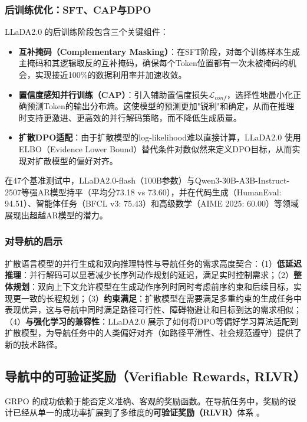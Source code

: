 \subsubsection{后训练优化：SFT、CAP与DPO}
LLaDA2.0 的后训练阶段包含三个关键组件：
\begin{itemize}
    \item \textbf{互补掩码（Complementary Masking）}：在SFT阶段，对每个训练样本生成主掩码和其逻辑取反的互补掩码，确保每个Token位置都有一次未被掩码的机会，实现接近100\%的数据利用率并加速收敛。
    \item \textbf{置信度感知并行训练（CAP）}：引入辅助置信度损失$\mathcal{L}_{conf}$，选择性地最小化正确预测Token的输出分布熵。这使模型的预测更加"锐利"和确定，从而在推理时支持更激进、更高效的并行解码策略，而不降低生成质量。
    \item \textbf{扩散DPO适配}：由于扩散模型的log-likelihood难以直接计算，LLaDA2.0 使用ELBO（Evidence Lower Bound）替代条件对数似然来定义DPO目标，从而实现对扩散模型的偏好对齐。
\end{itemize}

在47个基准测试中，LLaDA2.0-flash（100B参数）与Qwen3-30B-A3B-Instruct-2507等强AR模型持平（平均分73.18 vs 73.60），并在代码生成（HumanEval: 94.51）、智能体任务（BFCL v3: 75.43）和高级数学（AIME 2025: 60.00）等领域展现出超越AR模型的潜力。

\subsubsection{对导航的启示}
扩散语言模型的并行生成和双向推理特性与导航任务的需求高度契合：（1）\textbf{低延迟推理}：并行解码可以显著减少长序列动作规划的延迟，满足实时控制需求；（2）\textbf{整体规划}：双向上下文允许模型在生成动作序列时同时考虑前序约束和后续目标，实现更一致的长程规划；（3）\textbf{约束满足}：扩散模型在需要满足多重约束的生成任务中表现优异，这与导航中同时满足路径可行性、障碍物避让和目标到达的需求相似；（4）\textbf{与强化学习的兼容性}：LLaDA2.0 展示了如何将DPO等偏好学习算法适配到扩散模型，为导航任务中的人类偏好对齐（如路径平滑性、社会规范遵守）提供了新的技术路径。

\subsection{导航中的可验证奖励（Verifiable Rewards, RLVR）}
GRPO 的成功依赖于能否定义准确、客观的奖励函数。在导航任务中，奖励的设计已经从单一的成功率扩展到了多维度的\textbf{可验证奖励（RLVR）}体系 \cite{verifiable_rewards}。

